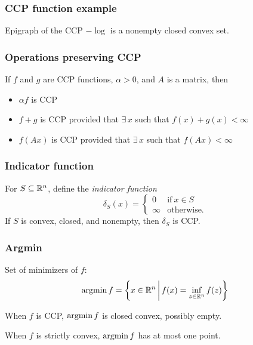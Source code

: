 \documentclass[10pt,mathserif]{beamer}
\begin{document}
\begin{frame}
\frametitle{CCP function example}
Epigraph of the CCP $-\log$ is a nonempty closed convex set.
\vspace{0.1in}
\begin{center}
\end{center}
\end{frame}

\begin{frame}
\frametitle{Operations preserving CCP}
If $f$ and $g$ are CCP functions, $\alpha>0$, and $A$ is a matrix, then
\begin{itemize}
\item
$\alpha f$ is CCP
\item
$f+g$ is CCP provided that $\exists\,x$ such that $f(x)+g(x)<\infty$
\item
$f(Ax)$ is CCP provided that $\exists\,x$ such that $f(Ax)<\infty$
\end{itemize}
\end{frame}

\begin{frame}
\frametitle{Indicator function}
For $S\subseteq\mathbb{R}^n$,
define the \emph{indicator function}
\[
    \delta_S(x) = \begin{cases}
        0& \text{if}~x\in S\\
        \infty& \text{otherwise.}
    \end{cases}
\]
If $S$ is convex, closed, and nonempty, then $\delta_S$ is CCP.
\end{frame}

\begin{frame}
\frametitle{Argmin}
Set of minimizers of $f$:
\[
\operatorname*{argmin} f=\left\{x\in \mathbb{R}^n\,\bigg|\, f(x)=\inf_{z\in \mathbb{R}^n}f(z)\right\}
\]
\vspace{0.2in}

When $f$ is CCP, $\operatorname*{argmin} f$ is closed convex, possibly empty.
\vspace{0.2in}


When $f$ is strictly convex, $\operatorname*{argmin} f$ has at most one point.
\end{frame}
\end{document}
